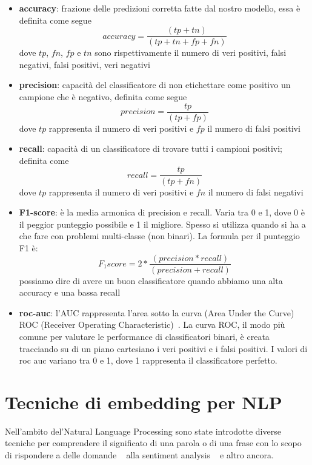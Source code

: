 \begin{itemize}
    \item \textbf{accuracy}: frazione delle predizioni corretta fatte dal nostro modello, essa è definita come segue
    \begin{equation*} accuracy = \dfrac {(tp + tn)}{(tp + tn + fp + fn)}\end{equation*} 
    dove $tp$, $fn$, $fp$ e $tn$ sono rispettivamente il numero di veri positivi, falsi negativi, falsi positivi, veri negativi
    
    \item \textbf{precision}: capacità del classificatore di non etichettare come positivo un campione che è negativo, definita come segue
    \begin{equation*} precision = \dfrac {tp}{(tp + fp)}\end{equation*} 
    dove $tp$ rappresenta il numero di veri positivi e $fp$ il numero di falsi positivi
    
    \item \textbf{recall}: capacità di un classificatore di trovare tutti i campioni positivi; definita come
    \begin{equation*} recall = \dfrac {tp}{(tp + fn)}\end{equation*} 
    dove $tp$ rappresenta il numero di veri positivi e $fn$ il numero di falsi negativi
    
    \item \textbf{F1-score}: è la media armonica di precision e recall. Varia tra 0 e 1, dove 0 è il peggior punteggio possibile e 1 il migliore. Spesso si utilizza quando si ha a che fare con problemi multi-classe (non binari). La formula per il punteggio F1 è:
    \begin{equation}
       F_1score = 2 * \frac{(precision * recall)}{(precision + recall)}
    \end{equation}
    possiamo dire di avere un buon classificatore quando abbiamo una alta accuracy e una bassa recall
    \item \textbf{roc-auc}: l'AUC rappresenta l'area sotto la curva (Area Under the Curve) ROC (Receiver Operating Characteristic)~\cite{RocAUC}. La curva ROC, il modo più comune per valutare le performance di classificatori binari, è creata tracciando su di un piano cartesiano i veri positivi e i falsi positivi. I valori di roc auc variano tra 0 e 1, dove 1 rappresenta il classificatore perfetto.
\end{itemize}

\section{Tecniche di embedding per NLP}
\label{sec:use}
Nell'ambito del'Natural Language Processing sono state introdotte diverse tecniche per comprendere il significato di una parola o di una frase con lo scopo di rispondere a delle domande ~\cite{wu2017visual} alla sentiment analysis ~\cite{kaur2017survey} e altro ancora.

